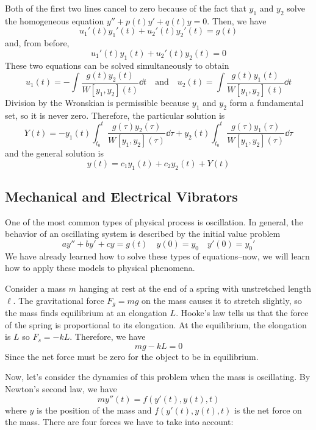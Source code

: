 Both of the first two lines cancel to zero because of the fact that $y_1$ and $y_2$ solve the homogeneous equation $y'' + p(t)y' + q(t)y = 0$. Then, we have
\[ u_1'(t)y_1'(t) + u_2'(t)y_2'(t) = g(t) \]
and, from before,
\[ u_1'(t)y_1(t) + u_2'(t)y_2(t) = 0 \]
These two equations can be solved simultaneously to obtain 
\[ u_1(t) = -\int \frac{g(t)y_2(t)}{W[y_1, y_2](t)}\dd t \quad \text{and}\quad u_2(t) = \int \frac{g(t)y_1(t)}{W[y_1, y_2](t)}\dd t\]
Division by the Wronskian is permissible because $y_1$ and $y_2$ form a fundamental set, so it is never zero. Therefore, the particular solution is
\[ Y(t) = -y_1(t)\int_{t_0}^t \frac{g(\tau )y_2(\tau)}{W[y_1, y_2](\tau)}\dd \tau + y_2(t)\int_{t_0}^t \frac{g(\tau )y_1(\tau)}{W[y_1, y_2](\tau)}\dd \tau \]
and the general solution is
\[ y(t) = c_1y_1(t) + c_2y_2(t) + Y(t) \]
\subsection{Mechanical and Electrical Vibrators}
One of the most common types of physical process is oscillation. In general, the behavior of an oscillating system is described by the initial value problem
\[ ay'' + by' + cy = g(t) \quad y(0) = y_0 \quad y'(0) = y_0' \]
We have already learned how to solve these types of equations--now, we will learn how to apply these models to physical phenomena. \par
Consider a mass $m$ hanging at rest at the end of a spring with unstretched length $\ell$. The gravitational force $F_g = mg$ on the mass causes it to stretch slightly, so the mass finds equilibrium at an elongation $L$. Hooke's law tells us that the force of the spring is proportional to its elongation. At the equilibrium, the elongation is $L$ so $F_s = -kL$. Therefore, we have
\[ mg - kL = 0 \]
Since the net force must be zero for the object to be in equilibrium. \par
Now, let's consider the dynamics of this problem when the mass is oscillating. By Newton's second law, we have
\[ my''(t) = f(y'(t), y(t), t) \]
where $y$ is the position of the mass and $f(y'(t), y(t), t)$ is the net force on the mass. There are four forces we have to take into account:
